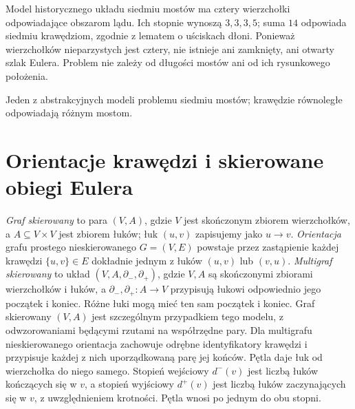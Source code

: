 \begin{przyklad}
Model historycznego układu siedmiu mostów ma cztery
wierzchołki odpowiadające obszarom lądu. Ich stopnie
wynoszą $3,3,3,5$; suma $14$ odpowiada siedmiu krawędziom,
zgodnie z lematem o uściskach dłoni. Ponieważ wierzchołków
nieparzystych jest cztery, nie istnieje ani zamknięty,
ani otwarty szlak Eulera. Problem nie zależy od długości
mostów ani od ich rysunkowego położenia.
\end{przyklad}

\begin{center}

{\footnotesize Jeden z abstrakcyjnych modeli problemu siedmiu mostów;
krawędzie równoległe odpowiadają różnym mostom.}
\end{center}

\section{Orientacje krawędzi i skierowane obiegi Eulera}
\label{sec:tg-orientacje}

\begin{definicja}
\emph{Graf skierowany} to para $(V,A)$, gdzie $V$ jest
skończonym zbiorem wierzchołków, a $A\subseteq V\times V$
jest zbiorem łuków; łuk $(u,v)$ zapisujemy jako $u\to v$.
\emph{Orientacja} grafu prostego nieskierowanego $G=(V,E)$
powstaje przez zastąpienie każdej krawędzi $\{u,v\}\in E$
dokładnie jednym z łuków $(u,v)$ lub $(v,u)$.
\emph{Multigraf skierowany} to układ $(V,A,\partial_-,\partial_+)$,
gdzie $V,A$ są skończonymi zbiorami wierzchołków i łuków,
a $\partial_-,\partial_+:A\to V$ przypisują łukowi
odpowiednio jego początek i koniec. Różne łuki mogą
mieć ten sam początek i koniec. Graf skierowany $(V,A)$
jest szczególnym przypadkiem tego modelu, z odwzorowaniami
będącymi rzutami na współrzędne pary.
Dla multigrafu nieskierowanego orientacja zachowuje odrębne
identyfikatory krawędzi i przypisuje każdej z nich
uporządkowaną parę jej końców. Pętla daje łuk od
wierzchołka do niego samego.
Stopień wejściowy $d^-(v)$ jest liczbą łuków kończących się
w $v$, a stopień wyjściowy $d^+(v)$ jest liczbą łuków
zaczynających się w $v$, z uwzględnieniem krotności.
Pętla wnosi po jednym do obu stopni.
\end{definicja}

